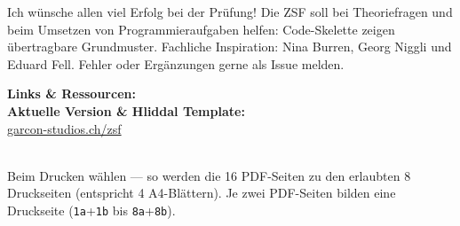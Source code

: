 \label{sec:14-schlusswort}
\begin{contentbox}
Ich wünsche allen viel Erfolg bei der Prüfung! Die ZSF soll bei Theoriefragen und beim Umsetzen von Programmieraufgaben helfen: Code-Skelette zeigen übertragbare Grundmuster. Fachliche Inspiration: Nina Burren, Georg Niggli und Eduard Fell. Fehler oder Ergänzungen gerne als Issue melden.

\ZSFgapS
\noindent\textbf{Links \& Ressourcen:}\\
\textbf{Aktuelle Version \& Hliddal Template:}\\
\href{https://garcon-studios.ch/zsf}{garcon-studios.ch/zsf}
\end{contentbox}

\begin{contentbox}
 \\
Beim Drucken  wählen — so werden die 16 PDF-Seiten zu den erlaubten 8 Druckseiten (entspricht 4 A4-Blättern). Je zwei PDF-Seiten bilden eine Druckseite (\texttt{1a}+\texttt{1b} bis \texttt{8a}+\texttt{8b}).
\end{contentbox}
